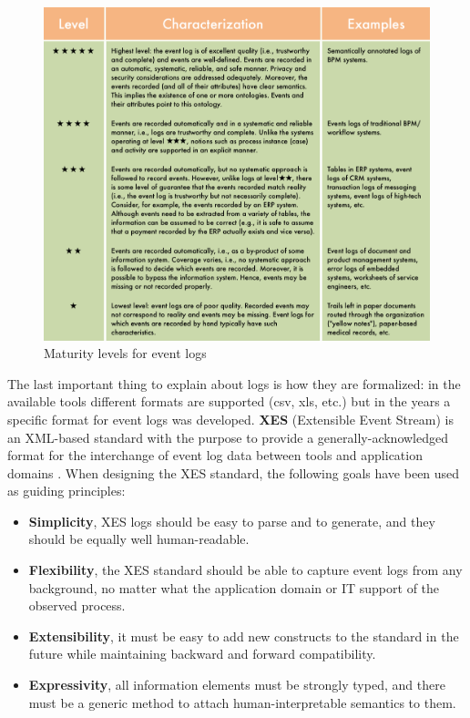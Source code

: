 \begin{figure}[!ht]
    \centering
\includegraphics[width=\textwidth]{images/pm_loglevels.png}
    \caption{Maturity levels for event logs \cite{DBLP:conf/bpm/ProcessMiningManifesto}}
    \label{images:pm_loglevels}
\end{figure}

The last important thing to explain about logs is how they are formalized: in the available tools different formats are 
supported (csv, xls, etc.) but in the years a specific format for event logs was developed. \textbf{XES} (Extensible Event 
Stream) is an XML-based standard with the purpose to provide a generally-acknowledged format for the interchange of event 
log data between tools and application domains \cite{XESstandard}.
When designing the XES standard, the following goals have been used as guiding principles:
\begin{itemize}
    \item \textbf{Simplicity}, XES logs should be easy to parse and to generate, and they should be equally well 
        human-readable.
    \item \textbf{Flexibility}, the XES standard should be able to capture event logs from any background, no matter what 
        the application domain or IT support of the observed process. 
    \item \textbf{Extensibility}, it must be easy to add new constructs to the standard in the future while maintaining 
        backward and forward compatibility.
    \item \textbf{Expressivity}, all information elements must be strongly typed, and there must be a generic method to 
        attach human-interpretable semantics to them.
\end{itemize}

